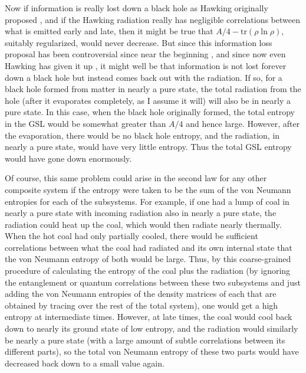 \documentclass[12pt]{article} \usepackage{latexsym}
\begin{document}
Now if information is really lost down a black hole as Hawking
originally proposed \cite{Haw76b}, and if the Hawking radiation really
has negligible correlations between what is emitted early and late,
then it might be true that $A/4 -{\mathrm{tr}}(\rho\ln\rho)$, suitably
regularized, would never decrease.  But since this information loss
proposal has been controversial since near the beginning
\cite{Page80,Pagereview}, and since now even Hawking has given it up
\cite{HawGR17}, it might well be that information is not lost forever
down a black hole but instead comes back out with the radiation.  If
so, for a black hole formed from matter in nearly a pure state, the
total radiation from the hole (after it evaporates completely, as I
assume it will) will also be in nearly a pure state.  In this case,
when the black hole originally formed, the total entropy in the GSL
would be somewhat greater than $A/4$ and hence large.  However, after
the evaporation, there would be no black hole entropy, and the
radiation, in nearly a pure state, would have very little entropy.
Thus the total GSL entropy would have gone down enormously.

Of course, this same problem could arise in the second law for any
other composite system if the entropy were taken to be the sum of the
von Neumann entropies for each of the subsystems.  For example, if one
had a lump of coal in nearly a pure state with incoming radiation also
in nearly a pure state, the radiation could heat up the coal, which
would then radiate nearly thermally.  When the hot coal had only
partially cooled, there would be sufficient correlations between what
the coal had radiated and its own internal state that the von Neumann
entropy of both would be large.  Thus, by this coarse-grained
procedure of calculating the entropy of the coal plus the radiation
(by ignoring the entanglement or quantum correlations between these
two subsystems and just adding the von Neumann entropies of the
density matrices of each that are obtained by tracing over the rest of
the total system), one would get a high entropy at intermediate times.
However, at late times, the coal would cool back down to nearly its
ground state of low entropy, and the radiation would similarly be
nearly a pure state (with a large amount of subtle correlations
between its different parts), so the total von Neumann entropy of these
two parts would have decreased back down to a small value again.
\end{document}
